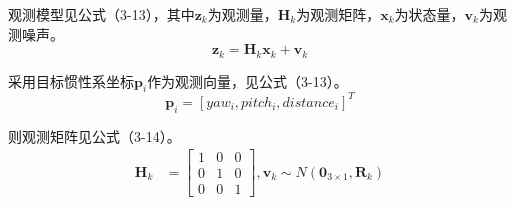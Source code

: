观测模型见公式（3-13），其中$\boldsymbol z_k$为观测量，$\boldsymbol H_k$为观测矩阵，$\boldsymbol x_k$为状态量，$\boldsymbol v_k$为观测噪声。
\begin{equation} \boldsymbol z_{k} = \boldsymbol H_k\boldsymbol x_k + \boldsymbol {v}_{k} \end{equation}
\par
采用目标惯性系坐标$\boldsymbol p_i$作为观测向量，见公式（3-13）。
\begin{equation}\boldsymbol p_i = [yaw_i,pitch_i,distance_i]^T \end{equation} 
\par
则观测矩阵见公式（3-14）。
\begin{equation} \begin{aligned} \boldsymbol H_k &=  \left[\begin{array}{cccccc} 1 & 0 &0    \\ 0  &1 &0  \\ 0 &0  &1   \end{array}\right],\boldsymbol {v}_{k} \sim N\left(\boldsymbol 0_{3 \times 1}, \boldsymbol {R}_k\right) \end{aligned} \end{equation}
\par



